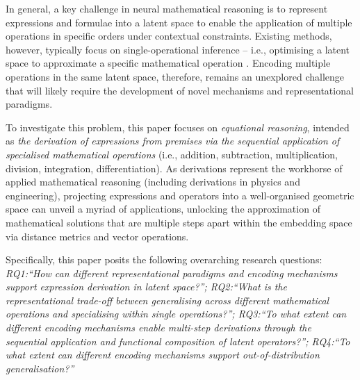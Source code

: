 \documentclass[11pt]{article}
\begin{document}
In general, a key challenge in neural mathematical reasoning is to represent expressions and formulae into a latent space to enable the application of multiple operations in specific orders under contextual constraints. Existing methods, however, typically focus on single-operational inference -- i.e., optimising a latent space to approximate a specific mathematical operation \cite{lee2019mathematical,lample2019deep,welleck2022symbolic}. Encoding multiple operations in the same latent space, therefore, remains an unexplored challenge that will likely require the development of novel mechanisms and representational paradigms.

To investigate this problem, this paper focuses on \emph{equational reasoning}, intended as \emph{the derivation of expressions from premises via the sequential application of specialised mathematical operations} (i.e., addition, subtraction, multiplication, division, integration, differentiation). As derivations represent the workhorse of applied mathematical reasoning (including derivations in physics and engineering), projecting expressions and operators into a well-organised geometric space can unveil a myriad of applications, unlocking the approximation of mathematical solutions that are multiple steps apart within the embedding space via distance metrics and vector operations.

Specifically, this paper posits the following overarching research questions: \emph{RQ1:``How can different representational paradigms and encoding mechanisms support expression derivation in latent space?''; 
RQ2:``What is the representational trade-off between generalising across different mathematical operations and specialising within single operations?''; 
RQ3:``To what extent can different encoding mechanisms enable multi-step derivations through the sequential application and functional composition of latent operators?''; RQ4:``To what extent can different encoding mechanisms support out-of-distribution generalisation?'' }
\end{document}
